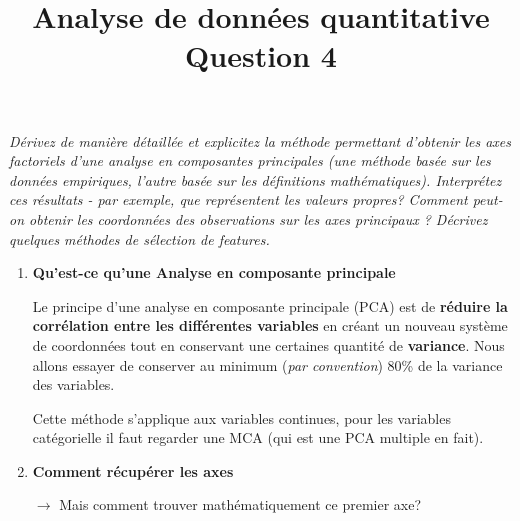 \documentclass[a4paper, 11pt, onecolumn]{article}
\title{Analyse de données quantitative\\Question 4}
\date{}
\begin{document}
\maketitle

\textit{Dérivez de manière détaillée et explicitez la méthode permettant d’obtenir les axes factoriels d’une analyse en composantes principales (une méthode basée sur les données empiriques, l’autre basée sur les définitions mathématiques). Interprétez ces résultats - par exemple, que représentent les valeurs propres? Comment peut-on obtenir les coordonnées des observations sur les axes principaux ? Décrivez quelques méthodes de sélection de features.}

\begin{enumerate}
\item \textbf{Qu'est-ce qu'une Analyse en composante principale}

Le principe d'une analyse en composante principale (PCA) est de 
\textbf{réduire la corrélation entre les différentes variables} 
en créant un nouveau système de coordonnées tout en conservant une certaines quantité de 
\textbf{variance}.
Nous allons essayer de conserver au minimum (\textit{par convention}) 80\% de la variance des variables. 

Cette méthode s'applique aux variables continues, pour les variables catégorielle il faut regarder une MCA (qui est une PCA multiple en fait). 

\item \textbf{Comment récupérer les axes}


$\rightarrow $ Mais comment trouver mathématiquement ce premier axe? 


\end{enumerate}
\end{document}
